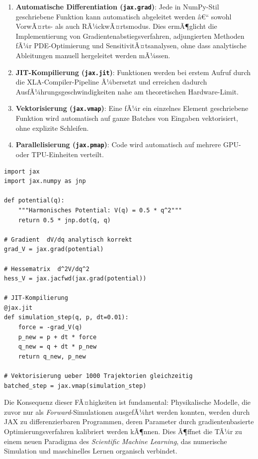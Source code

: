 \documentclass[12pt, a4paper]{article}
\begin{document}
\begin{enumerate}
  \item \textbf{Automatische Differentiation (\texttt{jax.grad})}: Jede
    in NumPy-Stil geschriebene Funktion kann automatisch abgeleitet
    werden â€“ sowohl VorwÃ¤rts- als auch RÃ¼ckwÃ¤rtsmodus. Dies ermÃ¶glicht
    die Implementierung von Gradientenabstiegsverfahren, adjungierten
    Methoden fÃ¼r PDE-Optimierung und SensitivitÃ¤tsanalysen, ohne dass
    analytische Ableitungen manuell hergeleitet werden mÃ¼ssen.

  \item \textbf{JIT-Kompilierung (\texttt{jax.jit})}: Funktionen werden
    bei erstem Aufruf durch die XLA-Compiler-Pipeline Ã¼bersetzt und
    erreichen dadurch AusfÃ¼hrungsgeschwindigkeiten nahe am theoretischen
    Hardware-Limit.

  \item \textbf{Vektorisierung (\texttt{jax.vmap})}: Eine fÃ¼r ein einzelnes
    Element geschriebene Funktion wird automatisch auf ganze Batches von
    Eingaben vektorisiert, ohne explizite Schleifen.

  \item \textbf{Parallelisierung (\texttt{jax.pmap})}: Code wird
    automatisch auf mehrere GPU- oder TPU-Einheiten verteilt.
\end{enumerate}

\begin{lstlisting}[caption={JAX: Automatische Differentiation und JIT}]
import jax
import jax.numpy as jnp

def potential(q):
    """Harmonisches Potential: V(q) = 0.5 * q^2"""
    return 0.5 * jnp.dot(q, q)

# Gradient  dV/dq analytisch korrekt
grad_V = jax.grad(potential)

# Hessematrix  d^2V/dq^2
hess_V = jax.jacfwd(jax.grad(potential))

# JIT-Kompilierung
@jax.jit
def simulation_step(q, p, dt=0.01):
    force = -grad_V(q)
    p_new = p + dt * force
    q_new = q + dt * p_new
    return q_new, p_new

# Vektorisierung ueber 1000 Trajektorien gleichzeitig
batched_step = jax.vmap(simulation_step)
\end{lstlisting}

Die Konsequenz dieser FÃ¤higkeiten ist fundamental: Physikalische Modelle,
die zuvor nur als \emph{Forward}-Simulationen ausgefÃ¼hrt werden konnten,
werden durch JAX zu differenzierbaren Programmen, deren Parameter durch
gradientenbasierte Optimierungsverfahren kalibriert werden kÃ¶nnen. Dies
Ã¶ffnet die TÃ¼r zu einem neuen Paradigma des \emph{Scientific Machine
Learning}, das numerische Simulation und maschinelles Lernen organisch
verbindet.
\end{document}
